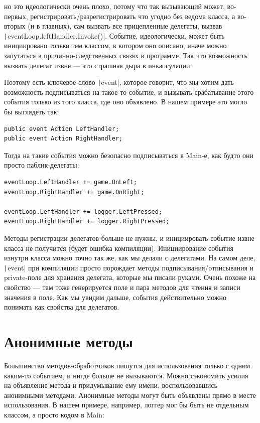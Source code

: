 \documentclass[a5paper]{article}
\begin{document}
но это идеологически очень плохо, потому что так вызывающий может, во-первых, регистрировать/разрегистрировать что угодно без ведома класса, а во-вторых (и в главных), сам вызвать все прицепленные делегаты, вызвав \texttt|eventLoop.leftHandler.Invoke()|. Событие, идеологически, может быть инициировано только тем классом, в котором оно описано, иначе можно запутаться в причинно-следственных связях в программе. Так что возможность вызвать делегат извне --- это страшная дыра в инкапсуляции.

Поэтому есть ключевое слово \texttt|event|, которое говорит, что мы хотим дать возможность подписываться на такое-то событие, и вызывать срабатывание этого события только из того класса, где оно объявлено. В нашем примере это могло бы выглядеть так:

\begin{verbatim}
public event Action LeftHandler;
public event Action RightHandler;
\end{verbatim}

Тогда на такие события можно безопасно подписываться в Main-е, как будто они просто паблик-делегаты:

\begin{verbatim}
eventLoop.LeftHandler += game.OnLeft;
eventLoop.RightHandler += game.OnRight;

eventLoop.LeftHandler += logger.LeftPressed;
eventLoop.RightHandler += logger.RightPressed;
\end{verbatim}

Методы регистрации делегатов больше не нужны, и инициировать событие извне класса не получится (будет ошибка компиляции). Инициирование события изнутри класса можно точно так же, как мы делали с делегатами. На самом деле, \texttt|event| при компиляции просто порождает методы подписывания/отписывания и private-поле для хранения делегата, которые мы писали руками. Очень похоже на свойство --- там тоже генерируется поле и пара методов для чтения и записи значения в поле. Как мы увидим дальше, события действительно можно понимать как свойства для делегатов.

\section{Анонимные методы}

Большинство методов-обработчиков пишутся для использования только с одним каким-то событием, и нигде больше не вызываются. Можно сэкономить усилия на объявление метода и придумывание ему имени, воспользовавшись анонимными методами. Анонимные методы могут быть объявлены прямо в месте использования. В нашем примере, например, логгер мог бы быть не отдельным классом, а просто кодом в Main:
\end{document}
